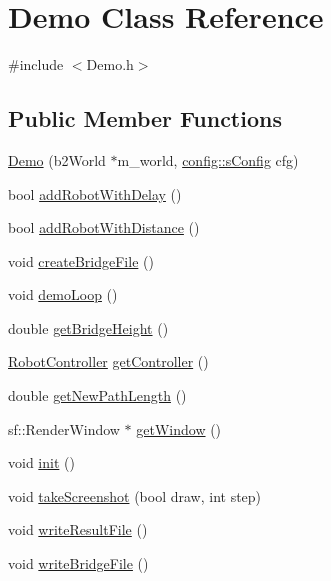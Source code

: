 \hypertarget{class_demo}{}\section{Demo Class Reference}
\label{class_demo}


{\ttfamily \#include $<$Demo.\+h$>$}

\subsection*{Public Member Functions}
\begin{DoxyCompactItemize}
\item 
\mbox{\hyperlink{class_demo_a7fa722430ba973c538ae230e407854ab}{Demo}} (b2\+World $\ast$m\+\_\+world, \mbox{\hyperlink{structconfig_1_1s_config}{config\+::s\+Config}} cfg)
\item 
bool \mbox{\hyperlink{class_demo_a4636f708574c6be85334ff16373e2292}{add\+Robot\+With\+Delay}} ()
\item 
bool \mbox{\hyperlink{class_demo_a37b03d288a1bf67f586cdfe1f9ba16af}{add\+Robot\+With\+Distance}} ()
\item 
void \mbox{\hyperlink{class_demo_ae0f7fe82aa44b946c13823d408b9ee01}{create\+Bridge\+File}} ()
\item 
void \mbox{\hyperlink{class_demo_a938c3b6ab1c98ce43f977dda9d4f2b3a}{demo\+Loop}} ()
\item 
double \mbox{\hyperlink{class_demo_ac6657b0f7f55a81ba215811d31d9e5b5}{get\+Bridge\+Height}} ()
\item 
\mbox{\hyperlink{class_robot_controller}{Robot\+Controller}} \mbox{\hyperlink{class_demo_af3f1105a11288fd13d54e85ef2485da5}{get\+Controller}} ()
\item 
double \mbox{\hyperlink{class_demo_acd4e28d1626c6979bbab2e396b717cba}{get\+New\+Path\+Length}} ()
\item 
sf\+::\+Render\+Window $\ast$ \mbox{\hyperlink{class_demo_a2b9c1e5275d36c3d82c0d4ee5d8a9741}{get\+Window}} ()
\item 
void \mbox{\hyperlink{class_demo_a585ce54e47b0624ca078492d9aa1c59c}{init}} ()
\item 
void \mbox{\hyperlink{class_demo_a8f833d4d73ccdb28cd2e4387fc3bb9e1}{take\+Screenshot}} (bool draw, int step)
\item 
void \mbox{\hyperlink{class_demo_a1b09c62228a007c49ddc0639a65341b2}{write\+Result\+File}} ()
\item 
void \mbox{\hyperlink{class_demo_a653b6b835b58959fea0758f2a1695002}{write\+Bridge\+File}} ()
\end{DoxyCompactItemize}
